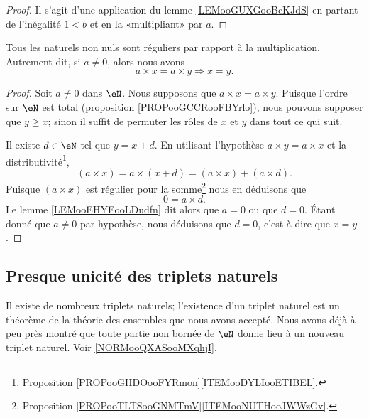 \begin{proof}
    Il s'agit d'une application du lemme \ref{LEMooGUXGooBcKJdS} en partant de l'inégalité \( 1<b\) et en la «multipliant» par \( a\).
\end{proof}

\begin{proposition}
    Tous les naturels non nuls sont réguliers par rapport à la multiplication. Autrement dit, si \( a\neq 0\), alors nous avons
    \begin{equation}
        a\times x=a\times y\Rightarrow x=y.
    \end{equation}
\end{proposition}

\begin{proof}
    Soit \( a\neq 0\) dans \( \eN\). Nous supposons que \( a\times x=a\times y\). Puisque l'ordre sur \( \eN\) est total (proposition \ref{PROPooGCCRooFBYrlo}), nous pouvons supposer que \( y\geq x\); sinon il suffit de permuter les rôles de \( x\) et \( y\) dans tout ce qui suit.

    Il existe \( d\in \eN\) tel que \( y=x+d\). En utilisant l'hypothèse \( a\times y=a\times x\) et la distributivité\footnote{Proposition \ref{PROPooGHDOooFYRmon}\ref{ITEMooDYLIooETIBEL}.}, 
    \begin{equation}
        (a\times x)=a\times (x+d)=(a\times x)+(a\times d).
    \end{equation}
    Puisque \( (a\times x)\) est régulier pour la somme\footnote{Proposition \ref{PROPooTLTSooGNMTmV}\ref{ITEMooNUTHooJWWzGv}.} nous en déduisons que
    \begin{equation}
        0=a\times d.
    \end{equation}
    Le lemme \ref{LEMooEHYEooLDudfn} dit alors que \( a=0\) ou que \( d=0\). Étant donné que \( a\neq 0\) par hypothèse, nous déduisons que \( d=0\), c'est-à-dire que \( x=y\).
\end{proof}

\subsection{Presque unicité des triplets naturels}

Il existe de nombreux triplets naturels; l'existence d'un triplet naturel est un théorème de la théorie des ensembles que nous avons accepté. Nous avons déjà à peu près montré que toute partie non bornée de \( \eN\) donne lieu à un nouveau triplet naturel. Voir \ref{NORMooQXASooMXqhjI}.

